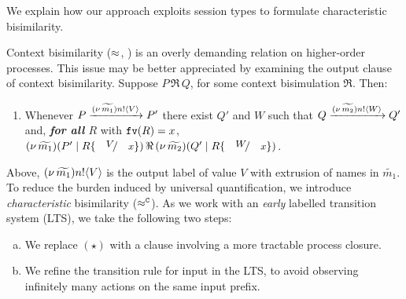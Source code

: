 

\label{subsec:intro:bisimulation}
\noi 
We explain how our approach exploits session types to 
formulate characteristic bisimilarity.

\smallskip 

Context bisimilarity ($\approx$, ) is an overly demanding relation on higher-order processes. 
This issue may be better appreciated by examining the output clause of context bisimilarity.
Suppose $P \,\Re\, Q$, for some context bisimulation $\Re$. Then:
\begin{enumerate}[$(\star)$]
	\item	Whenever 
		$P \xrightarrow{(\nu\, \widetilde{m_1}) n ! \langle V \rangle} P'$
		there exist
		$Q'$ and $W$
		such that 
		$Q \xrightarrow{(\nu\, \widetilde{m_2}) n ! \langle W \rangle} Q'$
		and, \emph{\textbf{for all} $R$}  with $\mathtt{fv}(R)=x$, 
		$\newsp{\widetilde{m_1}}{P' \Par R\subst{V}{x}} \,\Re\, \newsp{\widetilde{m_2}}{Q' \Par R\subst{W}{x}}$.
\end{enumerate}
\smallskip 
\noi 
Above, 
$(\nu\, \widetilde{m_1}) n ! \langle V \rangle$ is the output label of 
value $V$ with extrusion of names in $\widetilde{m_1}$.
To reduce the burden induced by 
universal quantification, we introduce 
\emph{characteristic}  
bisimilarity ($\approx^\mathtt{C}$). %
As we work with an \emph{early} labelled transition system (LTS), 
%
we take the following two steps: 
%
\begin{enumerate}[(a)]
	\item We replace $(\star)$ with a clause involving a more tractable process closure.
	\item We refine the transition rule for input in the LTS,
	to avoid observing infinitely many actions on the same input prefix.
\end{enumerate}
%
\smallskip

